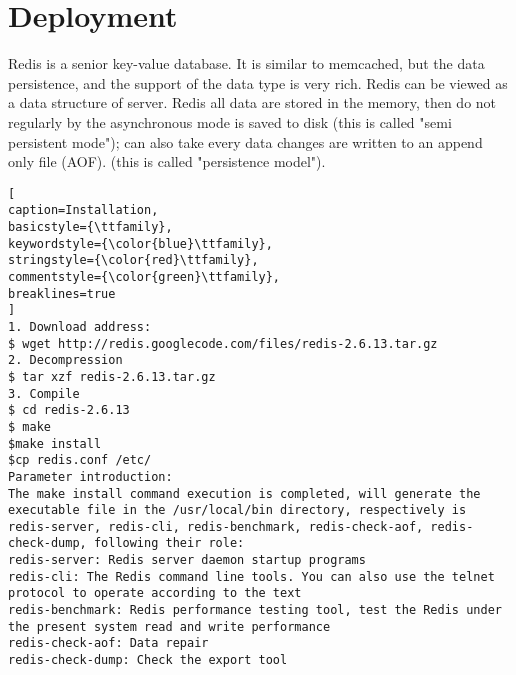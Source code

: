 \chapter{Deployment}

Redis is a senior key-value database. It is similar to memcached, but the data persistence, and the support of the data type is very rich. Redis can be viewed as a data structure of server.
Redis all data are stored in the memory, then do not regularly by the asynchronous mode is saved to disk (this is called "semi persistent mode"); can also take every data changes are written to an append only file (AOF). (this is called "persistence model").
\begin{lstlisting}[
caption=Installation,
basicstyle={\ttfamily},
keywordstyle={\color{blue}\ttfamily},
stringstyle={\color{red}\ttfamily},
commentstyle={\color{green}\ttfamily},
breaklines=true
]
1. Download address:
$ wget http://redis.googlecode.com/files/redis-2.6.13.tar.gz
2. Decompression
$ tar xzf redis-2.6.13.tar.gz
3. Compile
$ cd redis-2.6.13
$ make
$make install
$cp redis.conf /etc/
Parameter introduction:
The make install command execution is completed, will generate the executable file in the /usr/local/bin directory, respectively is redis-server, redis-cli, redis-benchmark, redis-check-aof, redis-check-dump, following their role:
redis-server: Redis server daemon startup programs
redis-cli: The Redis command line tools. You can also use the telnet protocol to operate according to the text
redis-benchmark: Redis performance testing tool, test the Redis under the present system read and write performance
redis-check-aof: Data repair
redis-check-dump: Check the export tool
\end{lstlisting}
